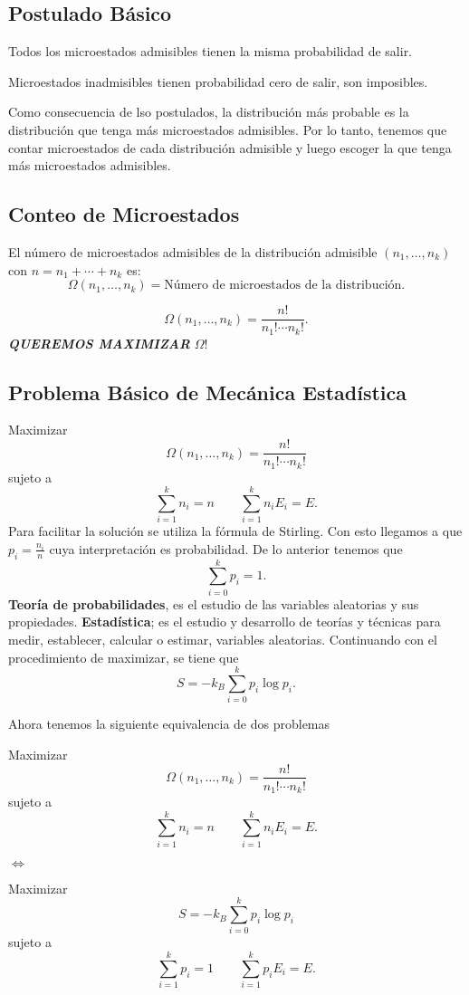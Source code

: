 \subsection{Postulado Básico}
\begin{tcolorbox}
	Todos los microestados admisibles tienen la misma probabilidad de salir.
\end{tcolorbox}


\begin{tcolorbox}
	Microestados inadmisibles tienen probabilidad cero de salir, son imposibles.
\end{tcolorbox}

Como consecuencia de lso postulados, la distribución más probable es la distribución que tenga más microestados admisibles. Por lo tanto, tenemos que contar microestados de cada distribución admisible y luego escoger la que tenga más microestados admisibles.

\subsection{Conteo de Microestados}
El número de microestados admisibles de la distribución admisible $(n_1 ,\ldots ,n_k)$ con $n = n_1 + \cdots + n_k$ es:
	$$ \Omega (n_1 ,\ldots ,n_k) = \text{Número de microestados de la distribución.} $$

	$$ \boxed{ \Omega (n_1 ,\ldots ,n_k) = \frac{n!}{n_1 ! \cdots n_k !}. } $$
\textbf{\textit{QUEREMOS MAXIMIZAR}} $\mathbf{\mathit{\Omega}}$!


\subsection{Problema Básico de Mecánica Estadística}
Maximizar
	$$ \Omega (n_1 ,\ldots ,n_k) = \frac{n!}{n_1 ! \cdots n_k !} $$
sujeto a 
	$$ \sum _{i=1} ^k n_i = n \qquad \sum _{i=1} ^k n_i E_i = E. $$
Para facilitar la solución se utiliza la fórmula de Stirling. Con esto llegamos a que $p_i = \frac{n_i}{n}$ cuya interpretación es probabilidad. De lo anterior tenemos que
	$$ \sum _{i=0} ^k p_i = 1. $$
\textbf{Teoría de probabilidades}, es el estudio de las variables aleatorias y sus propiedades. \textbf{Estadística}; es el estudio y desarrollo de teorías y técnicas para medir, establecer, calcular o estimar, variables aleatorias. Continuando con el procedimiento de maximizar, se tiene que
	$$ \boxed{ S = -k_B \sum _{i=0} ^k p_i \log{p_i}. } $$
	
Ahora tenemos la siguiente equivalencia de dos problemas
\begin{tcolorbox}
	Maximizar
	$$ \Omega (n_1 ,\ldots ,n_k) = \frac{n!}{n_1 ! \cdots n_k !} $$
sujeto a 
	$$ \sum _{i=1} ^k n_i = n \qquad \sum _{i=1} ^k n_i E_i = E. $$
\end{tcolorbox}
$\Leftrightarrow$
\begin{tcolorbox}
	Maximizar
	$$ S = -k_B \sum _{i=0} ^k p_i \log{p_i} $$
sujeto a 
	$$ \sum _{i=1} ^k p_i = 1 \qquad \sum _{i=1} ^k p_i E_i = E. $$
\end{tcolorbox}

